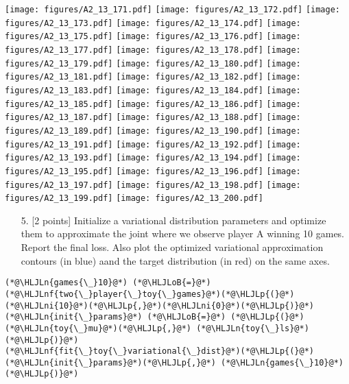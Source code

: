 \documentclass[12pt,a4paper]{article}
\newcommand{\HLJLn}[1]{#1}
\newcommand{\HLJLnf}[1]{\textcolor[RGB]{66,102,213}{#1}}
\newcommand{\HLJLni}[1]{\textcolor[RGB]{59,151,46}{#1}}
\newcommand{\HLJLoB}[1]{\textcolor[RGB]{102,102,102}{\textbf{#1}}}
\newcommand{\HLJLp}[1]{#1}
\begin{document}
\texttt{[image: figures/A2\_13\_171.pdf]}
\texttt{[image: figures/A2\_13\_172.pdf]}
\texttt{[image: figures/A2\_13\_173.pdf]}
\texttt{[image: figures/A2\_13\_174.pdf]}
\texttt{[image: figures/A2\_13\_175.pdf]}
\texttt{[image: figures/A2\_13\_176.pdf]}
\texttt{[image: figures/A2\_13\_177.pdf]}
\texttt{[image: figures/A2\_13\_178.pdf]}
\texttt{[image: figures/A2\_13\_179.pdf]}
\texttt{[image: figures/A2\_13\_180.pdf]}
\texttt{[image: figures/A2\_13\_181.pdf]}
\texttt{[image: figures/A2\_13\_182.pdf]}
\texttt{[image: figures/A2\_13\_183.pdf]}
\texttt{[image: figures/A2\_13\_184.pdf]}
\texttt{[image: figures/A2\_13\_185.pdf]}
\texttt{[image: figures/A2\_13\_186.pdf]}
\texttt{[image: figures/A2\_13\_187.pdf]}
\texttt{[image: figures/A2\_13\_188.pdf]}
\texttt{[image: figures/A2\_13\_189.pdf]}
\texttt{[image: figures/A2\_13\_190.pdf]}
\texttt{[image: figures/A2\_13\_191.pdf]}
\texttt{[image: figures/A2\_13\_192.pdf]}
\texttt{[image: figures/A2\_13\_193.pdf]}
\texttt{[image: figures/A2\_13\_194.pdf]}
\texttt{[image: figures/A2\_13\_195.pdf]}
\texttt{[image: figures/A2\_13\_196.pdf]}
\texttt{[image: figures/A2\_13\_197.pdf]}
\texttt{[image: figures/A2\_13\_198.pdf]}
\texttt{[image: figures/A2\_13\_199.pdf]}
\texttt{[image: figures/A2\_13\_200.pdf]}

\begin{itemize}
\item[5. ] [2 points] Initialize a variational distribution parameters and optimize them to approximate the joint where we observe player A winning 10 games. Report the final loss. Also plot the optimized variational approximation contours (in blue) aand the target distribution (in red) on the same axes.

\end{itemize}

\begin{lstlisting}
(*@\HLJLn{games{\_}10}@*) (*@\HLJLoB{=}@*) (*@\HLJLnf{two{\_}player{\_}toy{\_}games}@*)(*@\HLJLp{(}@*)(*@\HLJLni{10}@*)(*@\HLJLp{,}@*)(*@\HLJLni{0}@*)(*@\HLJLp{)}@*)
(*@\HLJLn{init{\_}params}@*) (*@\HLJLoB{=}@*) (*@\HLJLp{(}@*)(*@\HLJLn{toy{\_}mu}@*)(*@\HLJLp{,}@*) (*@\HLJLn{toy{\_}ls}@*)(*@\HLJLp{)}@*)
(*@\HLJLnf{fit{\_}toy{\_}variational{\_}dist}@*)(*@\HLJLp{(}@*)(*@\HLJLn{init{\_}params}@*)(*@\HLJLp{,}@*) (*@\HLJLn{games{\_}10}@*)(*@\HLJLp{)}@*)
\end{lstlisting}
\end{document}
